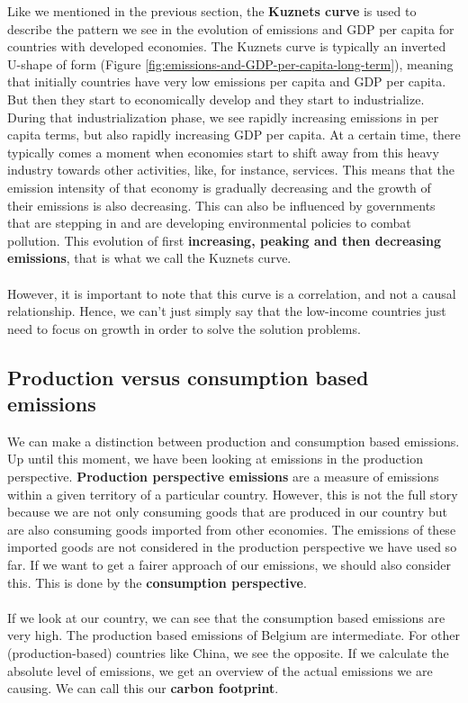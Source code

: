 \documentclass[../summary.tex]{subfiles}
\begin{document}
	 Like we mentioned in the previous section, the \textbf{Kuznets curve} is used to describe the pattern we see in the evolution of emissions and GDP per capita for countries with developed economies. The Kuznets curve is typically an inverted U-shape of form (Figure \ref{fig:emissions-and-GDP-per-capita-long-term}), meaning that initially countries have very low emissions per capita and GDP per capita. But then they start to economically develop and they start to industrialize. During that industrialization phase, we see rapidly increasing emissions in per capita terms, but also rapidly increasing GDP per capita. At a certain time, there typically comes a moment when economies start to shift away from this heavy industry towards other activities, like, for instance, services. This means that the emission intensity of that economy is gradually decreasing and the growth of their emissions is also decreasing. This can also be influenced by governments that are stepping in and are developing environmental policies to combat pollution. This evolution of first \textbf{increasing, peaking and then decreasing emissions}, that is what we call the Kuznets curve. 
	 \\\\
	 However, it is important to note that this curve is a correlation, and not a causal relationship. Hence, we can't just simply say that the low-income countries just need to focus on growth in order to solve the solution problems.
	 \newpage
	\subsection{Production versus consumption based emissions}
	
	We can make a distinction between production and consumption based emissions. Up until this moment, we have been looking at emissions in the production perspective. \textbf{Production perspective emissions} are a measure of emissions within a given territory of a particular country. However, this is not the full story because we are not only consuming goods that are produced in our country but are also consuming goods imported from other economies. The emissions of these imported goods are not considered in the production perspective we have used so far. If we want to get a fairer approach of our emissions, we should also consider this. This is done by the \textbf{consumption perspective}.
	\\\\
	If we look at our country, we can see that the consumption based emissions are very high. The production based emissions of Belgium are intermediate. For other (production-based) countries like China, we see the opposite. If we calculate the absolute level of emissions, we get an overview of the actual emissions we are causing. We can call this our \textbf{carbon footprint}.
	
\end{document}
